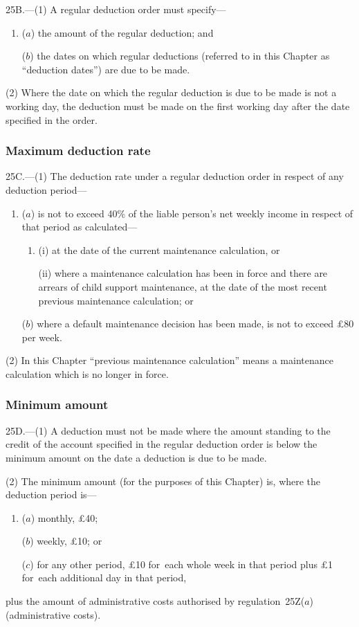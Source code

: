 \documentclass[12pt,a4paper]{article}
\begin{document}
25B.---(1)  A regular deduction order must specify—
\begin{enumerate}\item[]
($a$) the amount of the regular deduction; and

($b$) the dates on which regular deductions (referred to in this Chapter as “deduction dates”) are due to be made.
\end{enumerate}

(2) Where the date on which the regular deduction is due to be made is not a working day, the deduction must be made on the first working day after the date specified in the order.

\subsubsection[25C. Maximum deduction rate]{Maximum deduction rate}

25C.---(1)  The deduction rate under a regular deduction order in respect of any deduction period—
\begin{enumerate}\item[]
($a$) is not to exceed 40\% of the liable person’s net weekly income in respect of that period as calculated—
\begin{enumerate}\item[]
(i) at the date of the current maintenance calculation, or

(ii) where a maintenance calculation has been in force and there are arrears of child support maintenance, at the date of the most recent previous maintenance calculation; or
\end{enumerate}

($b$) where a default maintenance decision has been made, is not to exceed £80 per week.
\end{enumerate}

(2) In this Chapter “previous maintenance calculation” means a maintenance calculation which is no longer in force.

\subsubsection[25D. Minimum amount]{Minimum amount}

25D.---(1)  A deduction must not be made where the amount standing to the credit of the account specified in the regular deduction order is below the minimum amount on the date a deduction is due to be made.

(2) The minimum amount (for the purposes of this Chapter) is, where the deduction period is—
\begin{enumerate}\item[]
($a$) monthly, £40;

($b$) weekly, £10; or

($c$) for any other period, £10 for~each whole week in that period plus £1 for~each additional day in that period,
\end{enumerate}
plus the amount of administrative costs authorised by regulation~25Z($a$)  (administrative costs).
\end{document}

